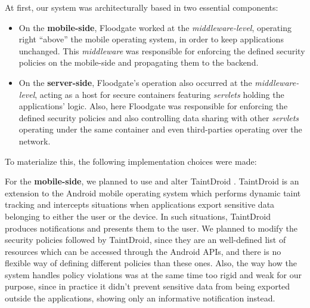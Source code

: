 At first, our system was architecturally based in two essential components:

\begin{itemize}
\item On the \textbf{mobile-side}, Floodgate worked at the \textit{middleware-level}, operating right ``above'' the mobile operating system, in order to keep applications unchanged. This \textit{middleware} was responsible for enforcing the defined security policies on the mobile-side and propagating them to the backend.

\item On the \textbf{server-side}, Floodgate's operation also occurred at the \textit{middleware-level}, acting as a host for secure containers featuring \textit{servlets} holding the applications' logic. Also, here Floodgate was responsible for enforcing the defined security policies and also controlling data sharing with other \textit{servlets} operating under the same container and even third-parties operating over the network.
\end{itemize}

To materialize this, the following implementation choices were made: 

For the \textbf{mobile-side}, we planned to use and alter TaintDroid \cite{taintdroid}. TaintDroid is an extension to the Android mobile operating system which performs dynamic taint tracking and intercepts situations when applications export sensitive data belonging to either the user or the device. In such situations, TaintDroid produces notifications and presents them to the user. We planned to modify the security policies followed by TaintDroid, since they are an well-defined list of resources which can be accessed through the Android APIs, and there is no flexible way of defining different policies than these ones. Also, the way how the system handles policy violations was at the same time too rigid and weak for our purpose, since in practice it didn't prevent sensitive data from being exported outside the applications, showing only an informative notification instead. 

